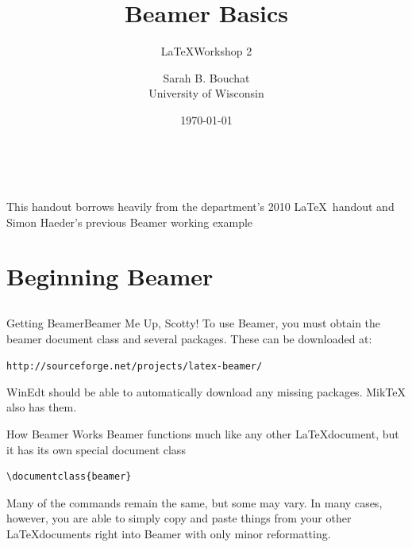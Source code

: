\documentclass[mathserif, xcolor=svgnames]{beamer}
\title{Beamer Basics}
\subtitle{\LaTeX Workshop 2}
\author{Sarah B. Bouchat \\ University of Wisconsin}
\date{\today}
\begin{document}

\begin{frame}[plain]
\titlepage
\vspace{.25in}
\hyperlink{hyper}{}\\
\begin{center}
\tiny{This handout borrows heavily from the department's 2010 \LaTeX~handout and Simon Haeder's previous Beamer working example}
\end{center}
\end{frame}

\section{Beginning Beamer}
\subsection{}
\begin{frame}[fragile, label=second]{Getting Beamer}{Beamer Me Up, Scotty!}
To use Beamer, you must obtain the beamer document class and several packages.  These can be downloaded at:

\vspace{10pt}

\verb+http://sourceforge.net/projects/latex-beamer/+

\vspace{10pt}
WinEdt should be able to automatically download any missing packages. MikTeX also has them.
\vspace{1.5in}

\hyperlink{hyper}{}
\end{frame}

\begin{frame}[fragile, label=third]{How Beamer Works}
Beamer functions much like any other \LaTeX  document, but it has its own special document class
\begin{verbatim}
\documentclass{beamer}
\end{verbatim}

Many of the commands remain the same, but some may vary.  In many cases, however, you are able to simply copy and paste things from your other \LaTeX documents right into Beamer with only minor reformatting.

\end{frame}
\end{document}
